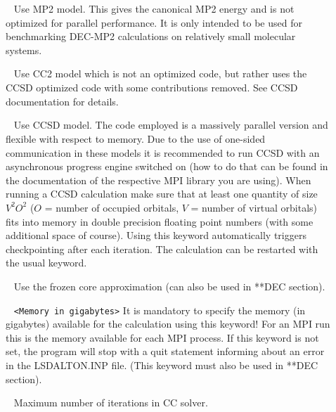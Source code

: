 \begin{description}

\item[]\verb| | \newline
Use MP2 model. This gives the canonical MP2 energy and is not optimized for parallel performance. It is only intended to be used for benchmarking DEC-MP2 calculations on relatively small molecular systems.

\item[]\verb| | \newline
Use CC2 model which is not an optimized code, but rather uses the CCSD optimized code with some contributions removed. See CCSD documentation for details.

\item[]\verb| | \newline
Use CCSD model. The code employed is a massively parallel version and flexible with respect to memory. Due to the use of one-sided communication in these models it is recommended to run CCSD with an asynchronous progress engine switched on (how to do that can be found in the documentation of the respective MPI library you are using). When running a CCSD calculation make sure that at least one quantity of size $V^2O^2$ ($O$ = number of occupied orbitals, $V$ = number of virtual orbitals) fits into memory in double precision floating point numbers (with some additional space of course). Using this keyword automatically triggers checkpointing after each iteration. The calculation can be restarted with the usual  keyword.

\item[]  \verb| | \newline
Use the frozen core approximation (can also be used in **DEC section).

\item[] \verb| | \newline
\verb|<Memory in gigabytes>| \newline
It is mandatory to specify the memory (in gigabytes) available for the calculation using this keyword! For an MPI run this is the memory available for each MPI process.
If this keyword is not set, the program will stop with a quit statement informing about an error in the LSDALTON.INP file.
(This keyword must also be used in **DEC section).

\item[]  \verb| | \newline
Maximum number of iterations in CC solver.


\end{description}
